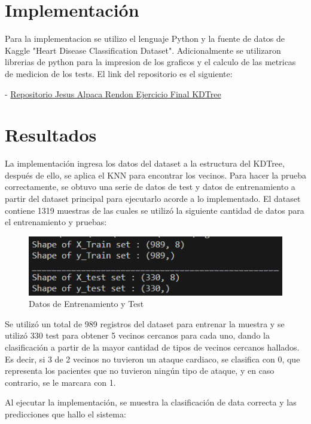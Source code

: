 \documentclass[12pt]{article} %
\begin{document}
\section{Implementación}
Para la implementacion se utilizo el lenguaje Python y la fuente de datos de Kaggle "Heart Disease Classification Dataset".
Adicionalmente se utilizaron librerias de python para la impresion de los graficos y el calculo de las metricas de medicion de los tests.
El link del repositorio es el siguiente:

- \href{https://github.com/Alpha004/AyEDJAAR2023/tree/main/Ejercicio_Final}{Repositorio Jesus Alpaca Rendon Ejercicio Final KDTree}

\section{Resultados}

La implementación ingresa los datos del dataset a la estructura del KDTree, después de ello, se aplica el KNN para encontrar los vecinos.
Para hacer la prueba correctamente, se obtuvo una serie de datos de test y datos de entrenamiento a partir del dataset principal para ejecutarlo
acorde a lo implementado.
El dataset contiene 1319 muestras de las cuales se utilizó la siguiente cantidad de datos para el entrenamiento y pruebas:

\begin{figure}[H]
\centering
\includegraphics[width=\textwidth]{data}
\caption{Datos de Entrenamiento y Test}
\end{figure}

Se utilizó un total de 989 registros del dataset para entrenar la muestra y se utilizó 330 test para obtener
5 vecinos cercanos para cada uno, dando la clasificación a partir de la mayor cantidad de tipos de vecinos cercanos hallados.
Es decir, si 3 de 2 vecinos no tuvieron un ataque cardiaco, se clasifica con 0, que representa los pacientes que no tuvieron 
ningún tipo de ataque, y en caso contrario, se le marcara con 1.

Al ejecutar la implementación, se muestra la clasificación de data correcta y las predicciones que hallo el sistema:
\end{document}

